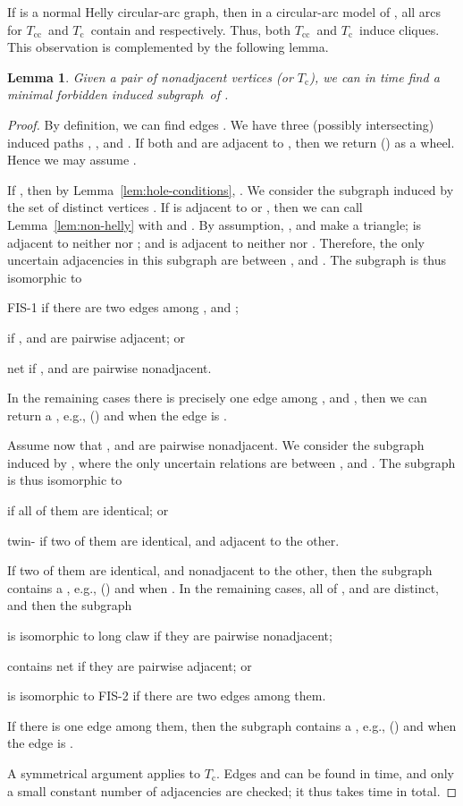 \documentclass[10pt]{article}
\newtheorem{lemma}[theorem]{Lemma}
\newcommand{\badgraph}{minimal forbidden induced subgraph}
\newcommand{\nhcag}{normal Helly circular-arc graph}
\newcommand{\oc}{\ensuremath{T_{\text{c}}}}
\newcommand{\occ}{\ensuremath{T_{\text{cc}}}}
\begin{document}
If  is a \nhcag, then in a circular-arc model of , all arcs for
\occ\ and \oc\ contain  and  respectively.  Thus,
both \occ\ and \oc\ induce cliques.  This observation is complemented
by the following lemma.
\begin{lemma}\label{lem:O}
  Given a pair of nonadjacent vertices  (or \oc), we can
  in  time find a \badgraph\ of .
\end{lemma}
\begin{proof}
  By definition, we can find edges .  We have three
  (possibly intersecting) induced paths , , and
  .  If both  and  are adjacent to , then we
  return () as a wheel.  Hence we may assume
  .

  If , then by Lemma~\ref{lem:hole-conditions}, .  We consider the subgraph induced by the set
  of distinct vertices .  If  is
  adjacent to  or , then we can call
  Lemma~\ref{lem:non-helly} with  and .  By assumption, , and  make a triangle;  is adjacent to neither  nor
  ; and  is adjacent to neither  nor .  Therefore,
  the only uncertain adjacencies in this subgraph are between ,
  and .  The subgraph is thus isomorphic to
  \begin{inparaitem}
  \item[(1)] FIS-1 if there are two edges among , and ;
  \item[(2)]  if , and  are pairwise
    adjacent; or
  \item[(3)] net if , and  are pairwise nonadjacent.
  \end{inparaitem}
  In the remaining cases there is precisely one edge among , and
  , then we can return a , e.g., () and 
  when the edge is .

  Assume now that , and  are pairwise nonadjacent.  We
  consider the subgraph induced by ,
  where the only uncertain relations are between , and .
  The subgraph is thus isomorphic to
  \begin{inparaenum}[(1)]
  \item  if all of them are identical; or
  \item twin- if two of them are identical, and adjacent to the
    other.
  \end{inparaenum}
  If two of them are identical, and nonadjacent to the other, then the
  subgraph contains a , e.g., () and  when
  .  In the remaining cases, all of , and  are
  distinct, and then the subgraph
  \begin{inparaenum}[(1)]
  \item  is isomorphic to long claw if they are pairwise nonadjacent;
  \item contains net  if they are pairwise
    adjacent; or
  \item  is isomorphic to FIS-2 if there are two edges among them.
  \end{inparaenum}
  If there is one edge among them, then the subgraph contains a ,
  e.g., () and  when the edge is .

  A symmetrical argument applies to \oc.  Edges  and  can be
  found in  time, and only a small constant number of
  adjacencies are checked; it thus takes  time in total.
\end{proof}
\end{document}
